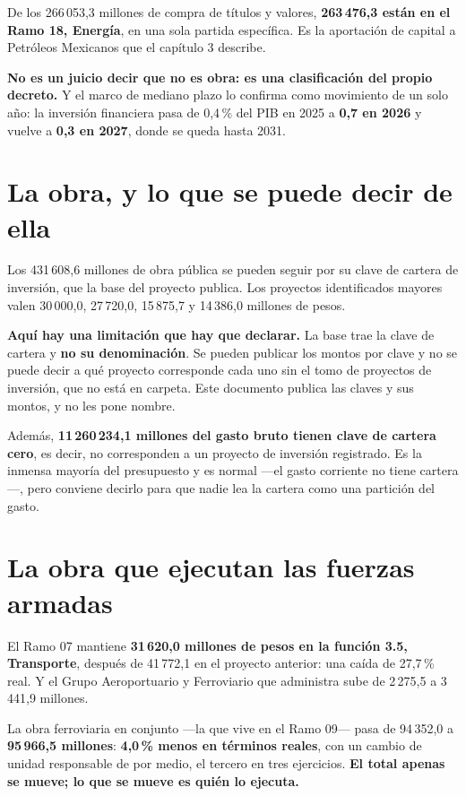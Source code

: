 De los 266\,053,3 millones de compra de títulos y valores, \textbf{263\,476,3 están en el Ramo
18, Energía}, en una sola partida específica. Es la aportación de capital a Petróleos
Mexicanos que el capítulo 3 describe.

\textbf{No es un juicio decir que no es obra: es una clasificación del propio decreto.} Y el
marco de mediano plazo lo confirma como movimiento de un solo año: la inversión financiera
pasa de 0,4\,\% del PIB en 2025 a \textbf{0,7 en 2026} y vuelve a \textbf{0,3 en 2027}, donde
se queda hasta 2031.

\section{La obra, y lo que se puede decir de ella}

Los 431\,608,6 millones de obra pública se pueden seguir por su clave de cartera de inversión,
que la base del proyecto publica. Los proyectos identificados mayores valen 30\,000,0,
27\,720,0, 15\,875,7 y 14\,386,0 millones de pesos.

\textbf{Aquí hay una limitación que hay que declarar.} La base trae la clave de cartera y
\textbf{no su denominación}. Se pueden publicar los montos por clave y no se puede decir a qué
proyecto corresponde cada uno sin el tomo de proyectos de inversión, que no está en carpeta.
Este documento publica las claves y sus montos, y no les pone nombre.

Además, \textbf{11\,260\,234,1 millones del gasto bruto tienen clave de cartera cero}, es
decir, no corresponden a un proyecto de inversión registrado. Es la inmensa mayoría del
presupuesto y es normal ---el gasto corriente no tiene cartera---, pero conviene decirlo para
que nadie lea la cartera como una partición del gasto.

\section{La obra que ejecutan las fuerzas armadas}

El Ramo 07 mantiene \textbf{31\,620,0 millones de pesos en la función 3.5, Transporte},
después de 41\,772,1 en el proyecto anterior: una caída de 27,7\,\% real. Y el Grupo
Aeroportuario y Ferroviario que administra sube de 2\,275,5 a 3\,441,9 millones.

La obra ferroviaria en conjunto ---la que vive en el Ramo 09--- pasa de 94\,352,0 a
\textbf{95\,966,5 millones}: \textbf{4,0\,\% menos en términos reales}, con un cambio de
unidad responsable de por medio, el tercero en tres ejercicios. \textbf{El total apenas se
mueve; lo que se mueve es quién lo ejecuta.}

